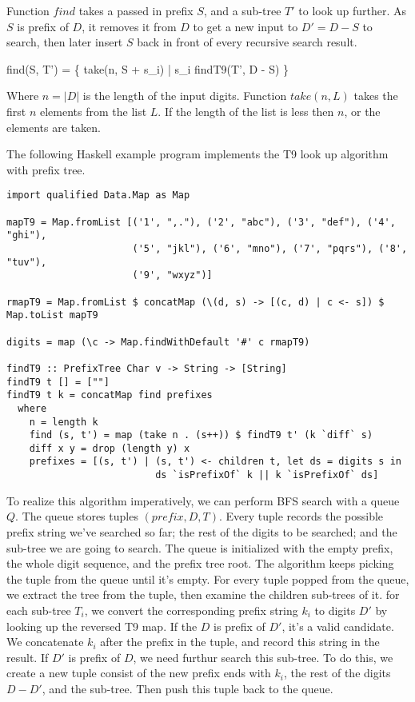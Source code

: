 \documentclass[b5paper]{article}
\begin{document}
Function $find$ takes a passed in prefix $S$, and a sub-tree $T'$ to look up further. As $S$ is prefix of $D$, it removes it from $D$ to get a new input to $D' = D - S$ to search, then later insert $S$ back in front of every recursive search result.

\be
find(S, T') = \{ take(n, S + s_i) | s_i \in findT9(T', D - S) \}
\ee

Where $n = |D|$ is the length of the input digits. Function $take(n, L)$ takes the first $n$ elements from the list $L$. If the length of the list is less then $n$, or the elements are taken.

The following Haskell example program implements the T9 look up algorithm with prefix tree.

\lstset{language=Haskell}
\begin{lstlisting}
import qualified Data.Map as Map

mapT9 = Map.fromList [('1', ",."), ('2', "abc"), ('3', "def"), ('4', "ghi"),
                      ('5', "jkl"), ('6', "mno"), ('7', "pqrs"), ('8', "tuv"),
                      ('9', "wxyz")]

rmapT9 = Map.fromList $ concatMap (\(d, s) -> [(c, d) | c <- s]) $ Map.toList mapT9

digits = map (\c -> Map.findWithDefault '#' c rmapT9)

findT9 :: PrefixTree Char v -> String -> [String]
findT9 t [] = [""]
findT9 t k = concatMap find prefixes
  where
    n = length k
    find (s, t') = map (take n . (s++)) $ findT9 t' (k `diff` s)
    diff x y = drop (length y) x
    prefixes = [(s, t') | (s, t') <- children t, let ds = digits s in
                          ds `isPrefixOf` k || k `isPrefixOf` ds]
\end{lstlisting}

To realize this algorithm imperatively, we can perform BFS search with a queue $Q$.
The queue stores tuples $(prefix, D, T)$. Every tuple records the possible
prefix string we've searched so far; the rest of the digits to be searched;
and the sub-tree we are going to search. The queue is initialized with the
empty prefix, the whole digit sequence, and the prefix tree root. The algorithm
keeps picking the tuple from the queue until it's empty. For every tuple
popped from the queue, we extract the tree from the tuple, then examine the
children sub-trees of it. for each sub-tree $T_i$, we convert the corresponding
prefix string $k_i$ to digits $D'$ by looking up the reversed T9 map. If the
$D$ is prefix of $D'$, it's a valid candidate. We concatenate $k_i$ after
the prefix in the tuple, and record this string in the result. If $D'$ is
prefix of $D$, we need furthur search this sub-tree. To do this, we
create a new tuple consist of the new prefix ends with $k_i$, the rest of
the digits $D-D'$, and the sub-tree. Then push this tuple back to the queue.
\end{document}
